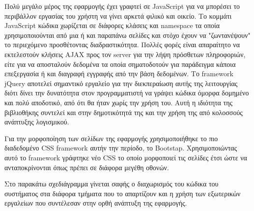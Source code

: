 Πολύ μεγάλο μέρος της εφαρμογής έχει γραφτεί σε JavaScript για να μπορέσει το περιβάλλον εργασίας του χρήστη να γίνει αρκετά φιλικό και οικείο. Το κομμάτι JavaScript κώδικα χωρίζεται σε διάφορες κλάσεις και namespace τα οποία χρησιμοποιούνται από μια ή και παραπάνω σελίδες και στόχο έχουν να "ζωντανέψουν" το περιεχόμενο προσθέτοντας διαδραστικότητα. Πολλές φορές είναι απαραίτητο να εκτελεστούν κλήσεις AJAX προς τον server για την λήψη πρόσθετων πληροφοριών, είτε για να αποσταλούν δεδομένα τα οποία σηματοδοτούν για παράδειγμα κάποια επεξεργασία ή και διαγραφή εγγραφής από την βάση δεδομένων. Το framework jQuery αποτελεί σημαντικό εργαλείο για την διεκπεραίωση αυτής της λειτουργίας διότι δίνει την δυνατότητα στον προγραμματιστή να γράψει κώδικα όμορφα δομημένο και πολύ αποδοτικό, από ότι θα ήταν χωρίς την χρήση του. Αυτή η ιδιότητα της βιβλιοθήκης συντελεί και στην δημοτικότητά της και την χρήση της από κολοσσούς ανάπτυξης λογισμικού.

Για την μορφοποίηση των σελίδων της εφαρμογής χρησιμοποιήθηκε το πιο διαδεδομένο CSS framework αυτήν την περίοδο, το Bootstap. Χρησιμοποιώντας αυτό το framework γράφτηκε νέο CSS το οποίο μορφοποιεί τις σελίδες έτσι ώστε να ανταποκρίνονται όπως πρέπει σε διάφορα μεγέθη οθονών.

Στο παρακάτω σχεδιάγραμμα γίνεται σαφής ο διαχωρισμός του κώδικα του συστήματος στα διάφορα τμήματα που το απαρτίζουν και η χρήση των εξωτερικών εργαλείων που συντέλεσαν στην ορθή ανάπτυξη της εφαρμογής.

